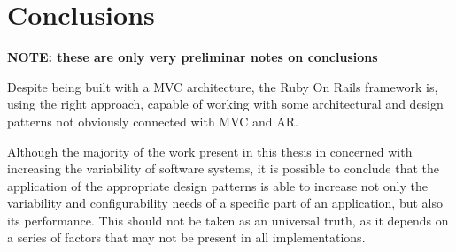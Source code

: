 \chapter{Conclusions}\label{chap:conclusions}

\textbf{NOTE: these are only very preliminar notes on conclusions}

Despite being built with a MVC architecture, the Ruby On Rails framework is, using the right approach, capable of working with some architectural and design patterns not obviously connected with MVC and AR.

Although the majority of the work present in this thesis in concerned with increasing the variability of software systems, it is possible to conclude that the application of the appropriate design patterns is able to increase not only the variability and configurability needs of a specific part of an application, but also its performance. This should not be taken as an universal truth, as it depends on a series of factors that may not be present in all implementations.


